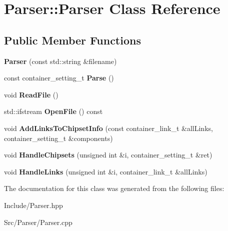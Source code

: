 \hypertarget{classParser_1_1Parser}{}\section{Parser\+:\+:Parser Class Reference}
\label{classParser_1_1Parser}
\subsection*{Public Member Functions}
\begin{DoxyCompactItemize}
\item 
\mbox{\label{classParser_1_1Parser_a952924a6b78b1c2578e50195578083df}} 
{\bfseries Parser} (const std\+::string \&filename)
\item 
\mbox{\label{classParser_1_1Parser_a2fd87731d739eac280d971d7ed5c92f8}} 
const container\+\_\+setting\+\_\+t {\bfseries Parse} ()
\item 
\mbox{\label{classParser_1_1Parser_a8424e2cb688b08587365d0b8fad5785c}} 
void {\bfseries Read\+File} ()
\item 
\mbox{\label{classParser_1_1Parser_a9083391260511c55c4dd45a7da45a430}} 
std\+::ifstream {\bfseries Open\+File} () const
\item 
\mbox{\label{classParser_1_1Parser_a02621eeb00222237d79ecdd99cd90155}} 
void {\bfseries Add\+Links\+To\+Chipset\+Info} (const container\+\_\+link\+\_\+t \&all\+Links, container\+\_\+setting\+\_\+t \&components)
\item 
\mbox{\label{classParser_1_1Parser_ad603df97da7d3d1df24ac9214d2d3b84}} 
void {\bfseries Handle\+Chipsets} (unsigned int \&i, container\+\_\+setting\+\_\+t \&ret)
\item 
\mbox{\label{classParser_1_1Parser_a8e8336c488a8406630d997617cc4c617}} 
void {\bfseries Handle\+Links} (unsigned int \&i, container\+\_\+link\+\_\+t \&all\+Links)
\end{DoxyCompactItemize}


The documentation for this class was generated from the following files\+:\begin{DoxyCompactItemize}
\item 
Include/Parser.\+hpp\item 
Src/\+Parser/Parser.\+cpp\end{DoxyCompactItemize}
